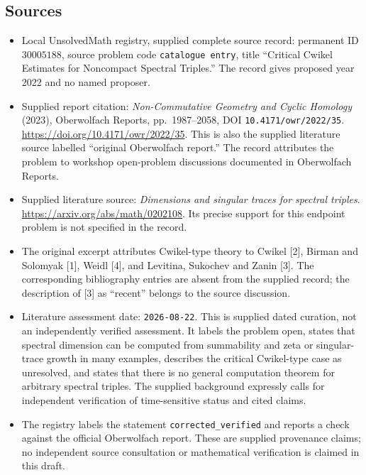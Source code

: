 \documentclass[11pt]{article}
\begin{document}
\subsection{Sources}
\begin{itemize}
\item Local UnsolvedMath registry, supplied complete source record: permanent ID \(30005188\), source problem code \texttt{catalogue entry}, title ``Critical Cwikel Estimates for Noncompact Spectral Triples.'' The record gives proposed year 2022 and no named proposer.
\item Supplied report citation: \emph{Non-Commutative Geometry and Cyclic Homology} (2023), Oberwolfach Reports, pp.~1987--2058, DOI \texttt{10.4171/owr/2022/35}. \url{https://doi.org/10.4171/owr/2022/35}. This is also the supplied literature source labelled ``original Oberwolfach report.'' The record attributes the problem to workshop open-problem discussions documented in Oberwolfach Reports.
\item Supplied literature source: \emph{Dimensions and singular traces for spectral triples}. \url{https://arxiv.org/abs/math/0202108}. Its precise support for this endpoint problem is not specified in the record.
\item The original excerpt attributes Cwikel-type theory to Cwikel [2], Birman and Solomyak [1], Weidl [4], and Levitina, Sukochev and Zanin [3]. The corresponding bibliography entries are absent from the supplied record; the description of [3] as ``recent'' belongs to the source discussion.
\item Literature assessment date: \texttt{2026-08-22}. This is supplied dated curation, not an independently verified assessment. It labels the problem open, states that spectral dimension can be computed from summability and zeta or singular-trace growth in many examples, describes the critical Cwikel-type case as unresolved, and states that there is no general computation theorem for arbitrary spectral triples. The supplied background expressly calls for independent verification of time-sensitive status and cited claims.
\item The registry labels the statement \texttt{corrected\_verified} and reports a check against the official Oberwolfach report. These are supplied provenance claims; no independent source consultation or mathematical verification is claimed in this draft.
\end{itemize}
\end{document}
